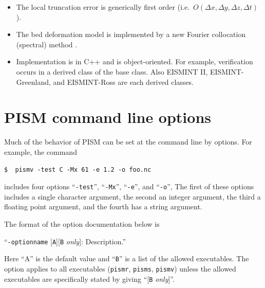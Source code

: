 \documentclass[11pt,final]{amsart}
\renewcommand{\t}[1]{\texttt{#1}}
\begin{document}
\begin{itemize}
\item The local truncation error is generically first order (i.e.~$O(\Delta x,\Delta y,\Delta z,\Delta t)$).
\item The bed deformation model is implemented by a new Fourier collocation (spectral) method \cite{BLKfastearth}.
\item Implementation is in C++ and is object-oriented.  For example, verification occurs in a derived class of the base class.  Also EISMINT II, EISMINT-Greenland, and EISMINT-Ross are each derived classes.
\end{itemize}


\clearpage\newpage



\appendix

\newcommand{\subsect}[1]{\bigskip\subsection{#1}\rule{0mm}{2mm}\par\medskip}
\newcommand{\subsubsect}[1]{\medskip\subsubsection{#1}\rule{0mm}{2mm}\par\smallskip}

\clearpage\newpage
\section{PISM command line options}\label{sect:options}

Much of the behavior of PISM can be set at the command line by options.  For example, the command 

\verb|$  pismv -test C -Mx 61 -e 1.2 -o foo.nc|

\noindent includes four options ``\verb|-test|'', ``\verb|-Mx|'', ``\verb|-e|'', and ``\verb|-o|'',  The first of these options includes a single character argument, the second an integer argument, the third a floating point argument, and the fourth has a string argument.

The format of the option documentation below is

\centerline{``\large\texttt{-optionname} [\texttt{A}][\texttt{B} \emph{only}]: \quad Description.\normalsize''}

\noindent Here ``A'' is the default value and ``\t{B}'' is a list of the allowed executables.  The option applies to all executables (\verb|pismr|, \verb|pisms|, \verb|pismv|) unless the allowed executables are specifically stated by giving ``[\t{B} \textsl{only}]''.
\end{document}

